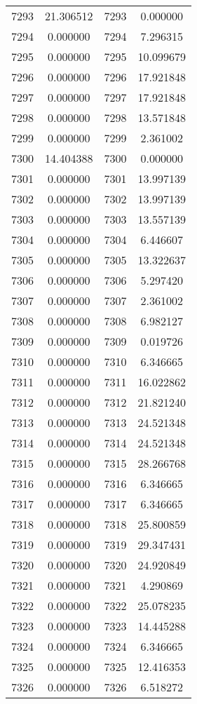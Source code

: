 \documentclass[12pt]{article}
\begin{document}
\begin{longtable}{@{}cccc@{}}
7293 & 21.306512 & 7293 & 0.000000 \\
7294 & 0.000000 & 7294 & 7.296315 \\
7295 & 0.000000 & 7295 & 10.099679 \\
7296 & 0.000000 & 7296 & 17.921848 \\
7297 & 0.000000 & 7297 & 17.921848 \\
7298 & 0.000000 & 7298 & 13.571848 \\
7299 & 0.000000 & 7299 & 2.361002 \\
7300 & 14.404388 & 7300 & 0.000000 \\
7301 & 0.000000 & 7301 & 13.997139 \\
7302 & 0.000000 & 7302 & 13.997139 \\
7303 & 0.000000 & 7303 & 13.557139 \\
7304 & 0.000000 & 7304 & 6.446607 \\
7305 & 0.000000 & 7305 & 13.322637 \\
7306 & 0.000000 & 7306 & 5.297420 \\
7307 & 0.000000 & 7307 & 2.361002 \\
7308 & 0.000000 & 7308 & 6.982127 \\
7309 & 0.000000 & 7309 & 0.019726 \\
7310 & 0.000000 & 7310 & 6.346665 \\
7311 & 0.000000 & 7311 & 16.022862 \\
7312 & 0.000000 & 7312 & 21.821240 \\
7313 & 0.000000 & 7313 & 24.521348 \\
7314 & 0.000000 & 7314 & 24.521348 \\
7315 & 0.000000 & 7315 & 28.266768 \\
7316 & 0.000000 & 7316 & 6.346665 \\
7317 & 0.000000 & 7317 & 6.346665 \\
7318 & 0.000000 & 7318 & 25.800859 \\
7319 & 0.000000 & 7319 & 29.347431 \\
7320 & 0.000000 & 7320 & 24.920849 \\
7321 & 0.000000 & 7321 & 4.290869 \\
7322 & 0.000000 & 7322 & 25.078235 \\
7323 & 0.000000 & 7323 & 14.445288 \\
7324 & 0.000000 & 7324 & 6.346665 \\
7325 & 0.000000 & 7325 & 12.416353 \\
7326 & 0.000000 & 7326 & 6.518272 \\

\end{longtable}
\end{document}
